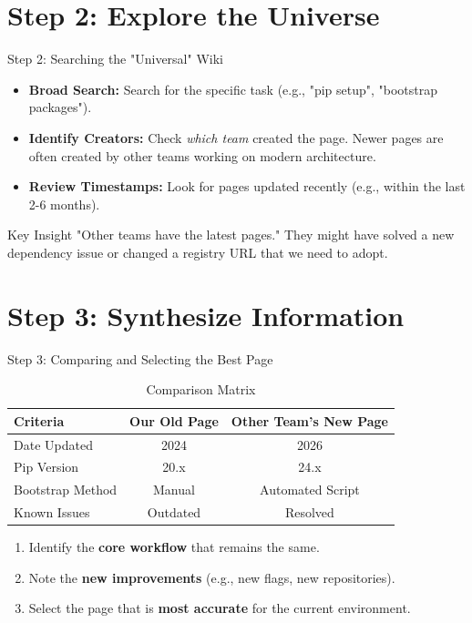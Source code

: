 \documentclass{beamer}
\begin{document}
	\section{Step 2: Explore the Universe}
	\begin{frame}{Step 2: Searching the "Universal" Wiki}
		\begin{itemize}
			\item \textbf{Broad Search:} Search for the specific task (e.g., "pip setup", "bootstrap packages").
			\item \textbf{Identify Creators:} Check \textit{which team} created the page. Newer pages are often created by other teams working on modern architecture.
			\item \textbf{Review Timestamps:} Look for pages updated recently (e.g., within the last 2-6 months).
		\end{itemize}
		\begin{block}{Key Insight}
			"Other teams have the latest pages." They might have solved a new dependency issue or changed a registry URL that we need to adopt.
		\end{block}
	\end{frame}
	
	\section{Step 3: Synthesize Information}
	\begin{frame}{Step 3: Comparing and Selecting the Best Page}
		\begin{table}
			\centering
			\begin{tabular}{|l|c|c|}
				\hline
				\textbf{Criteria} & \textbf{Our Old Page} & \textbf{Other Team's New Page} \\
				\hline
				Date Updated & 2024 & 2026 \\
				\hline
				Pip Version & 20.x & 24.x \\
				\hline
				Bootstrap Method & Manual & Automated Script \\
				\hline
				Known Issues & Outdated & Resolved \\
				\hline
			\end{tabular}
			\caption{Comparison Matrix}
		\end{table}
		\vspace{0.5cm}
		\begin{enumerate}
			\item Identify the \textbf{core workflow} that remains the same.
			\item Note the \textbf{new improvements} (e.g., new flags, new repositories).
			\item Select the page that is \textbf{most accurate} for the current environment.
		\end{enumerate}
	\end{frame}
	
\end{document}
